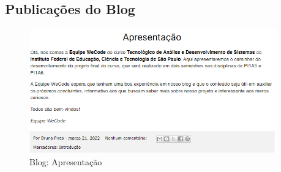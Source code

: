 
\begin{apendicesenv}

\partapendices

\chapter{Publicações do Blog}

\begin{figure}[H]
	\centering
	\caption{Blog: Apresentação}
	\includegraphics[width=0.95\textwidth]{../imagens/blog-posts/semana00apresentacao.png}
\end{figure}


\end{apendicesenv}

